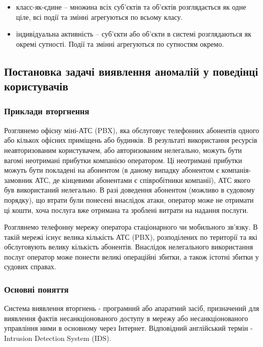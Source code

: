 \begin{itemize}
  \item класс-як-єдине -- множина всіх суб'єктів та об'єктів
        розглядається як одне ціле, всі події та змінні
        агрегуються по всьому класу.
  \item індивідуальна активність -- суб'єкти або об'єкти в 
        системі розглядаються як окремі сутності. Події та змінні агрегуються по сутностям окремо.
\end{itemize}

\subsection{Постановка задачі виявлення аномалій у поведінці користувачів}

\subsubsection{Приклади вторгнення}

  Розглянемо офісну міні-АТС (PBX), яка обслуговує телефонних абонентів одного або кількох офісних приміщень або будинків. В результаті використання ресурсів неавторизованим користувачем, або авторизованим нелегально, можуть бути вагомі неотримані прибутки компанією оператором. Ці неотримані прибутки можуть бути покладені на абонентом (в даному випадку абонентом є компанія-замовник АТС, де кінцевими абонентами є співробітники компанії), АТС якого був використаний нелегально. В разі доведення абонентом (можливо в судовому порядку), що втрати були понесені внаслідок атаки, оператор може не отримати ці кошти, хоча послуга вже отримана та зроблені витрати на надання послуги.

  Розглянемо телефонну мережу оператора стаціонарного чи мобильного зв'язку. В такій мережі існує велика кількість АТС (PBX), розподілених по території та які обслуговують велику кількість абонентів. Внаслідок нелегального використання послуг оператор може понести великі операційні збитки, а також істотні збитки у судових справах.

\subsubsection{Основні поняття}

  Система виявлення вторгнень - програмний або апаратний засіб, призначений для виявлення фактів несанкціонованого доступу в мережу або несанкціонованого управління ними в основному через Інтернет. Відповідний англійський термін - Intrusion Detection System (IDS).

